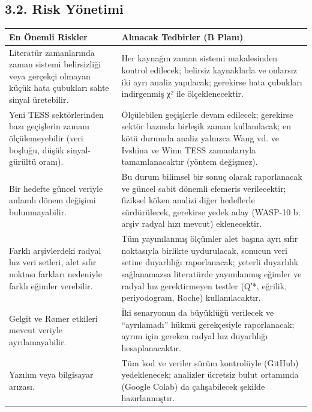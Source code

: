 \subsection*{3.2. Risk Yönetimi}
\begin{center}
\small
\begin{tabularx}{\textwidth}{>{\raggedright\arraybackslash}X >{\raggedright\arraybackslash}X}
\toprule
En Önemli Riskler & Alınacak Tedbirler (B Planı)\\
\midrule
Literatür zamanlarında zaman sistemi belirsizliği veya gerçekçi olmayan küçük hata çubukları sahte sinyal üretebilir. & Her kaynağın zaman sistemi makalesinden kontrol edilecek; belirsiz kaynaklarla ve onlarsız iki ayrı analiz yapılacak; gerekirse hata çubukları indirgenmiş χ² ile ölçeklenecektir.\\
Yeni TESS sektörlerinden bazı geçişlerin zamanı ölçülemeyebilir (veri boşluğu, düşük sinyal-gürültü oranı). & Ölçülebilen geçişlerle devam edilecek; gerekirse sektör bazında birleşik zaman kullanılacak; en kötü durumda analiz yalnızca Wang vd. ve Ivshina ve Winn TESS zamanlarıyla tamamlanacaktır (yöntem değişmez).\\
Bir hedefte güncel veriyle anlamlı dönem değişimi bulunmayabilir. & Bu durum bilimsel bir sonuç olarak raporlanacak ve güncel sabit dönemli efemeris verilecektir; fiziksel köken analizi diğer hedeflerle sürdürülecek, gerekirse yedek aday (WASP-10 b; arşiv radyal hızı mevcut) eklenecektir.\\
Farklı arşivlerdeki radyal hız veri setleri, alet sıfır noktası farkları nedeniyle farklı eğimler verebilir. & Tüm yayımlanmış ölçümler alet başına ayrı sıfır noktasıyla birlikte uydurulacak, sonucun veri setine duyarlılığı raporlanacak; yeterli duyarlılık sağlanamazsa literatürde yayımlanmış eğimler ve radyal hız gerektirmeyen testler (Q′*, eğrilik, periyodogram, Roche) kullanılacaktır.\\
Gelgit ve Rømer etkileri mevcut veriyle ayrılamayabilir. & İki senaryonun da büyüklüğü verilecek ve “ayrılamadı” hükmü gerekçesiyle raporlanacak; ayrım için gereken radyal hız duyarlılığı hesaplanacaktır.\\
Yazılım veya bilgisayar arızası. & Tüm kod ve veriler sürüm kontrolüyle (GitHub) yedeklenecek; analizler ücretsiz bulut ortamında (Google Colab) da çalışabilecek şekilde hazırlanmıştır.\\
\bottomrule
\end{tabularx}
\end{center}

